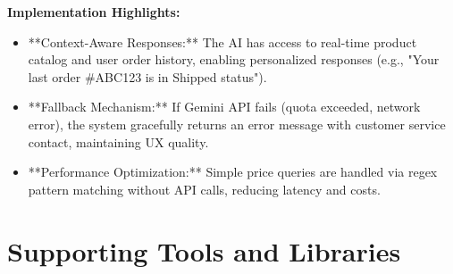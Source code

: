\textbf{Implementation Highlights:}
\begin{itemize}
    \item **Context-Aware Responses:** The AI has access to real-time product catalog and user order history, enabling personalized responses (e.g., "Your last order #ABC123 is in Shipped status").
    \item **Fallback Mechanism:** If Gemini API fails (quota exceeded, network error), the system gracefully returns an error message with customer service contact, maintaining UX quality.
    \item **Performance Optimization:** Simple price queries are handled via regex pattern matching without API calls, reducing latency and costs.
\end{itemize}

\section{Supporting Tools and Libraries}

